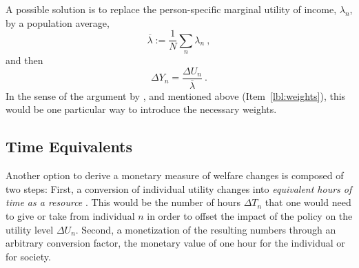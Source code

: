 A possible solution is to replace the person-specific marginal utility of income, $\lambda_n$, by a population average,
\begin{equation}
\overline\lambda := \frac{1}{N} \sum_n \lambda_n \ ,
\label{eq:av-utl-of-income}
\end{equation}
and then
\begin{equation}
\Delta Y_n = \frac{\Delta U_n}{\overline\lambda} \ .
\label{eq:using-av-utl-of-income}
\end{equation}
%
In the sense of the argument by \cite{Fowkes2010ValueOfTTS}, \cite{OECD2006CBA} and \cite{GuehnemannEtAl2011MethodologyReportMCA} mentioned above (Item~\ref{lbl:weights}), this would be one particular way to introduce the necessary weights.



\subsection{Time Equivalents}
\label{ch:economicEval:aggregatingValues:time}


Another option to derive a monetary measure of welfare changes is composed of two steps:
%
First, a conversion of individual utility changes into \emph{equivalent hours of time as a resource} \citep{JaradiazEtc2008ValueOfLeisure, MackieJara-DiazFowkesTt-savings}. This would be the number of hours $\Delta T_n$ that one would need to give or take from individual $n$ in order to offset the impact of the policy on the utility level $\Delta U_n$. 
%
Second, a monetization of the resulting numbers through an arbitrary conversion factor, \ie the monetary value of one hour for the individual or for society.

